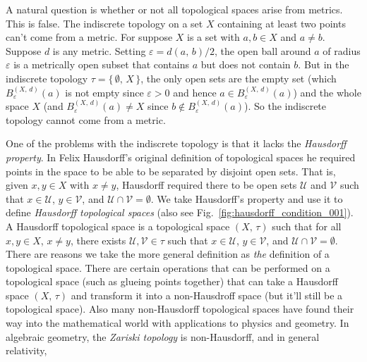 \documentclass{article}
\theoremstyle{plain}
\theoremstyle{normal}
\newenvironment{definition}{%
    \pushQED{\qed}\renewcommand{\qedsymbol}{$\blacksquare$}\definitionx%
}{%
    \popQED\enddefinitionx%
}
\begin{document}
    A natural question is whether or not all topological spaces arise from
    metrics. This is false. The indiscrete topology on a set $X$ containing
    at least two points can't come from a metric. For suppose $X$ is a set
    with $a,b\in{X}$ and $a\ne{b}$. Suppose $d$ is any metric. Setting
    $\varepsilon={d}(a,\,b)/2$, the open ball around $a$ of radius
    $\varepsilon$ is a metrically open subset that contains $a$ but does not
    contain $b$. But in the indiscrete topology $\tau=\{\,\emptyset,\,X\,\}$,
    the only open sets are the empty set (which $B_{\varepsilon}^{(X,\,d)}(a)$
    is not empty since $\varepsilon>0$ and hence
    $a\in{B}_{\varepsilon}^{(X,\,d)}(a)$) and the whole space $X$
    (and $B_{\varepsilon}^{(X,\,d)}(a)\ne{X}$ since
    $b\notin{B}_{\varepsilon}^{(X,\,d)}(a)$). So the indiscrete topology cannot
    come from a metric.
    \par\hfill\par
    One of the problems with the indiscrete topology is that it lacks the
    \textit{Hausdorff property}. In Felix Hausdorff's original definition of
    topological spaces he required points in the space to be able to be
    separated by disjoint open sets. That is, given $x,y\in{X}$ with
    $x\ne{y}$, Hausdorff required there to be open sets $\mathcal{U}$ and
    $\mathcal{V}$ such that $x\in\mathcal{U}$, $y\in\mathcal{V}$, and
    $\mathcal{U}\cap\mathcal{V}=\emptyset$. We take Hausdorff's property and
    use it to define \textit{Hausdorff topological spaces}
    (also see Fig.~\ref{fig:hausdorff_condition_001}).
    \begin{definition}[\textbf{Hausdorff Topological Space}]
        A Hausdorff topological space is a topological space $(X,\,\tau)$ such
        that for all $x,y\in{X}$, $x\ne{y}$, there exists
        $\mathcal{U},\mathcal{V}\in\tau$
        such that $x\in\mathcal{U}$, $y\in\mathcal{V}$, and
        $\mathcal{U}\cap\mathcal{V}=\emptyset$.
    \end{definition}
    There are reasons we take the more general definition as \textit{the}
    definition of a topological space. There are certain operations that can be
    performed on a topological space (such as glueing points together) that can
    take a Hausdorff space $(X,\,\tau)$ and transform it into a
    non-Hausdroff space (but it'll still be a topological space). Also many
    non-Hausdorff topological spaces have found their way into the mathematical
    world with applications to physics and geometry. In algebraic geometry,
    the \textit{Zariski topology} is non-Hausdorff, and in general relativity,
\end{document}
